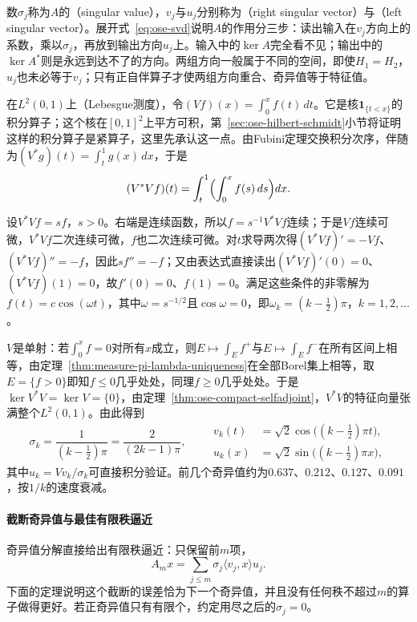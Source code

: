 数$\sigma_j$称为$A$的（singular value），$v_j$与$u_j$分别称为（right singular vector）与（left singular vector）。展开式~\eqref{eq:ose-svd}说明$A$的作用分三步：读出输入在$v_j$方向上的系数，乘以$\sigma_j$，再放到输出方向$u_j$上。输入中的$\ker A$完全看不见；输出中的$\ker A^*$则是永远到达不了的方向。两组方向一般属于不同的空间，即使$H_1=H_2$，$u_j$也未必等于$v_j$；只有正自伴算子才使两组方向重合、奇异值等于特征值。

\begin{example}[积分算子的奇异值分解]
\label{ex:ose-volterra-svd}
在$L^2(0,1)$上（Lebesgue测度），令$(Vf)(x)=\int_0^xf(t)\,dt$。它是核$\mathbf 1_{\{t<x\}}$的积分算子；这个核在$[0,1]^2$上平方可积，第~\ref{sec:ose-hilbert-schmidt}小节将证明这样的积分算子是紧算子，这里先承认这一点。由Fubini定理交换积分次序，伴随为$(V^*g)(t)=\int_t^1g(x)\,dx$，于是
\[
  (V^*Vf)(t)=\int_t^1\Bigl(\int_0^xf(s)\,ds\Bigr)dx .
\]

设$V^*Vf=sf$，$s>0$。右端是连续函数，所以$f=s^{-1}V^*Vf$连续；于是$Vf$连续可微，$V^*Vf$二次连续可微，$f$也二次连续可微。对$t$求导两次得$(V^*Vf)'=-Vf$、$(V^*Vf)''=-f$，因此$sf''=-f$；又由表达式直接读出$(V^*Vf)'(0)=0$、$(V^*Vf)(1)=0$，故$f'(0)=0$、$f(1)=0$。满足这些条件的非零解为$f(t)=c\cos(\omega t)$，其中$\omega=s^{-1/2}$且$\cos\omega=0$，即$\omega_k=(k-\tfrac12)\pi$，$k=1,2,\ldots$。

$V$是单射：若$\int_0^xf=0$对所有$x$成立，则$E\mapsto\int_Ef^+$与$E\mapsto\int_Ef^-$在所有区间上相等，由定理~\ref{thm:measure-pi-lambda-uniqueness}在全部Borel集上相等，取$E=\{f>0\}$即知$f\leq0$几乎处处，同理$f\geq0$几乎处处。于是$\ker V^*V=\ker V=\{0\}$，由定理~\ref{thm:ose-compact-selfadjoint}，$V^*V$的特征向量张满整个$L^2(0,1)$。由此得到
\[
  \sigma_k=\frac{1}{(k-\frac12)\pi}=\frac{2}{(2k-1)\pi},\qquad
  \begin{aligned}
    v_k(t)&=\sqrt2\cos\bigl((k-\tfrac12)\pi t\bigr),\\
    u_k(x)&=\sqrt2\sin\bigl((k-\tfrac12)\pi x\bigr),
  \end{aligned}
\]
其中$u_k=Vv_k/\sigma_k$可直接积分验证。前几个奇异值约为$0.637$、$0.212$、$0.127$、$0.091$，按$1/k$的速度衰减。
\end{example}

\paragraph{截断奇异值与最佳有限秩逼近}
奇异值分解直接给出有限秩逼近：只保留前$m$项，
\[
  A_mx=\sum_{j\leq m}\sigma_j\langle v_j,x\rangle u_j .
\]
下面的定理说明这个截断的误差恰为下一个奇异值，并且没有任何秩不超过$m$的算子做得更好。若正奇异值只有有限个，约定用尽之后的$\sigma_j=0$。

